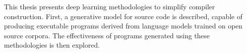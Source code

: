 


This thesis presents deep learning methodologies to simplify compiler construction. First, a generative model for source code is described, capable of producing executable programs derived from language models trained on open source corpora. The effectiveness of programs generated using these methodologies is then explored.
